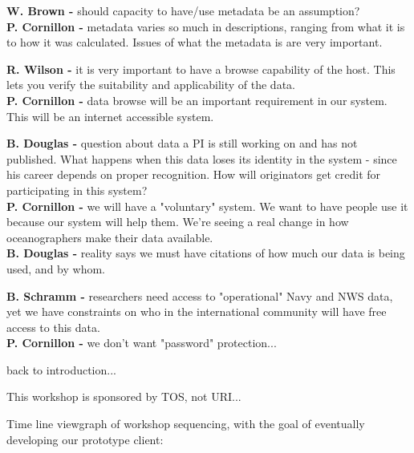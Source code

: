 {\bf W. Brown -} should capacity to have/use metadata be an assumption?\\
{\bf P. Cornillon -} metadata varies so much in descriptions, ranging from
what it is to how it was calculated.  Issues of what the metadata is are very 
important.

\medskip
{\bf R. Wilson -} it is very important to have a browse capability of the
host.  This lets you verify the suitability and applicability of the data.\\
{\bf P. Cornillon -} data browse will be an important requirement in our
system.  This will be an internet accessible system.

\medskip
{\bf B. Douglas -} question about data a PI is still working on and has not 
published. What happens when this data loses its identity in the system - 
since his career depends on proper recognition.  How will originators get 
credit for participating in this system?\\
{\bf P. Cornillon -} we will have a "voluntary" system.  We want to have
people use it because our system will help them. We're seeing a real change in 
how oceanographers make their data available.\\
{\bf B. Douglas -} reality says we must have citations of how much our data is 
being used, and by whom.

\medskip
{\bf B. Schramm -} researchers need access to "operational" Navy and NWS data, 
yet we have constraints on who in the international community will have 
free access to this data.\\
{\bf P. Cornillon -} we don't want "password" protection...

\medskip
\noindent back to introduction...

This workshop is sponsored by TOS, not URI...

Time line viewgraph of workshop sequencing, with the goal of eventually 
developing our prototype client:

